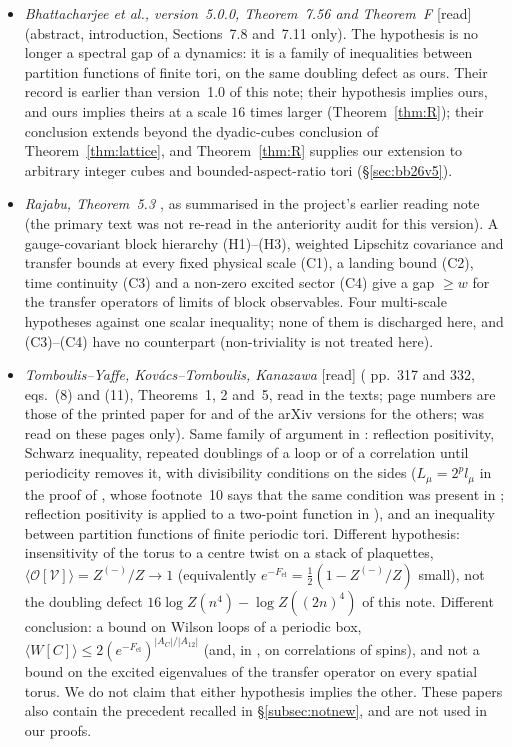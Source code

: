 \documentclass[11pt,a4paper]{article}
\theoremstyle{plain}
\theoremstyle{definition}
\theoremstyle{remark}
\numberwithin{equation}{section}
\newcommand{\st}[1]{\textsf{[#1]}}
\begin{document}
\begin{itemize}
imply the other.
\item \emph{Bhattacharjee et al., version~5.0.0, Theorem~7.56 and Theorem~F \cite{BB26v5}} \st{read} (abstract, introduction, Sections~7.8
and~7.11 only). The hypothesis is no longer a spectral gap of a dynamics: it is a family of inequalities between partition functions of
finite tori, on the same doubling defect as ours. Their record is earlier than version~1.0 of this note; their hypothesis implies ours, and ours implies theirs at a scale $16$ times larger (Theorem~\ref{thm:R}); their conclusion extends beyond the dyadic-cubes conclusion of Theorem~\ref{thm:lattice}, and Theorem~\ref{thm:R} supplies our extension to arbitrary integer cubes and bounded-aspect-ratio tori (\S\ref{sec:bb26v5}).
\item \emph{Rajabu, Theorem~5.3 \cite{Raj26}}, as summarised in the project's earlier reading note (the primary text was not re-read in the anteriority audit for this version). A gauge-covariant block hierarchy (H1)--(H3), weighted Lipschitz covariance and
transfer bounds at every fixed physical scale (C1), a landing bound (C2), time continuity (C3) and a non-zero excited sector (C4) give a
gap $\ge w$ for the transfer operators of limits of block observables. Four multi-scale hypotheses against one scalar inequality; none of
them is discharged here, and (C3)--(C4) have no counterpart (non-triviality is not treated here).
\item \emph{Tomboulis--Yaffe, Kov\'acs--Tomboulis, Kanazawa} \cite{TY85,KT02,Kan} \st{read} (\cite{TY85} pp.~317 and 332, \cite{KT02} eqs.~(8) and (11), \cite{Kan} Theorems~1, 2 and~5, read in the texts; page numbers are those of the printed paper for \cite{TY85} and of the arXiv versions for the others; \cite{TY85} was read on these pages only). Same family of argument in \cite{KT02,Kan}: reflection positivity, Schwarz inequality, repeated doublings of a loop or of a correlation until periodicity removes it, with divisibility conditions on the sides ($L_\mu=2^pl_\mu$ in the proof of \cite[Theorem~2, p.~9]{Kan}, whose footnote~10 says that the same condition was present in \cite{TY85}; reflection positivity is applied to a two-point function in \cite[p.~332]{TY85}), and an inequality between partition functions of finite periodic tori. Different hypothesis: insensitivity of the torus to a centre twist on a stack of plaquettes, $\langle\mathcal O[\mathcal V]\rangle=Z^{(-)}/Z\to1$ (equivalently $e^{-F_{\mathrm{el}}}=\frac12(1-Z^{(-)}/Z)$ small), not the doubling defect $16\log Z(n^4)-\log Z((2n)^4)$ of this note. Different conclusion: a bound on Wilson loops of a periodic box, $\langle W[C]\rangle\le2(e^{-F_{\mathrm{el}}})^{|A_C|/|A_{12}|}$ (and, in \cite{Kan}, on correlations of spins), and not a bound on the excited eigenvalues of the transfer operator on every spatial torus. We do not claim that either hypothesis implies the other. These papers also contain the precedent recalled in \S\ref{subsec:notnew}, and are not used in our proofs.

\end{itemize}
\end{document}
